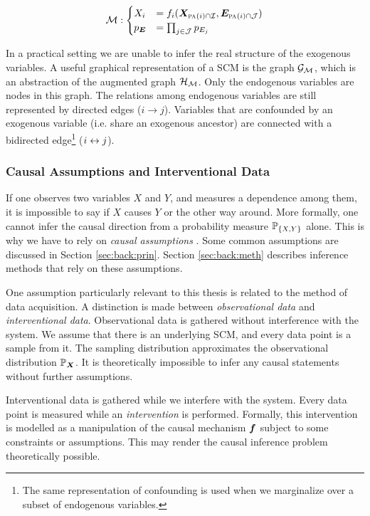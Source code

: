 $$\mathcal{M}: \begin{cases}
    X_i &= f_i(\bm{X}_{\text{\normalfont\scshape pa}_{}(i) \cap \mathcal{I}}, \bm{E}_{\text{\normalfont\scshape pa}_{}(i) \cap \mathcal{J}}) \\
    p_{\bm{E}} & = \prod_{j\in\mathcal{J}} p_{E_j}
\end{cases}$$

In a practical setting we are unable to infer the real structure of the exogenous variables. A useful graphical representation of a SCM is the graph $\mathcal{G}_{\mathcal{M}}$, which is an abstraction of the augmented graph $\mathcal{H}_{\mathcal{M}}$. Only the endogenous variables are nodes in this graph. The relations among endogenous variables are still represented by directed edges ($i \to j$). Variables that are confounded by an exogenous variable (i.e. share an exogenous ancestor) are connected with a bidirected edge\footnote{The same representation of confounding is used when we marginalize over a subset of endogenous variables.} ($i\leftrightarrow j$).

\subsubsection{Causal Assumptions and Interventional Data}
If one observes two variables $X$ and $Y$, and measures a dependence among them, it is impossible to say if $X$ causes $Y$ or the other way around. More formally, one cannot infer the causal direction from a probability measure $\mathbb{P}_{\{X,Y\}}$ alone. This is why we have to rely on \textit{causal assumptions} \citep{pearl2009causality}. Some common assumptions are discussed in Section \ref{sec:back:prin}. Section \ref{sec:back:meth} describes inference methods that rely on these assumptions. 

One assumption particularly relevant to this thesis is related to the method of data acquisition. A distinction is made between \textit{observational data} and \textit{interventional data}. Observational data is gathered without interference with the system. We assume that there is an underlying SCM, and every data point is a sample from it. The sampling distribution approximates the observational distribution $\mathbb{P}_{\bm{X}}$. It is theoretically impossible to infer any causal statements without further assumptions. 

Interventional data is gathered while we interfere with the system. Every data point is measured while an \textit{intervention} is performed. Formally, this intervention is modelled as a manipulation of the causal mechanism $\bm{f}$ subject to some constraints or assumptions. This may render the causal inference problem theoretically possible. 

